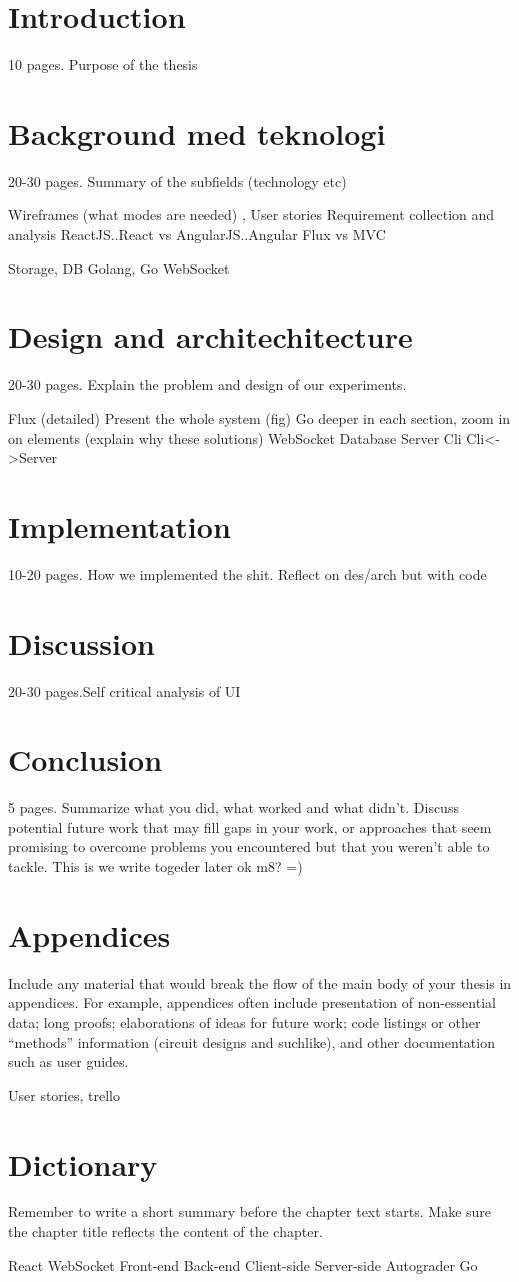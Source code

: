 \documentclass[12pt, a4paper]{report}
\begin{document}
\section{Introduction}
10 pages. Purpose of the thesis

\section{Background med teknologi}
20-30 pages. Summary of the subfields (technology etc)

Wireframes (what modes are needed) , User stories
Requirement collection and analysis
ReactJS..React vs AngularJS..Angular
Flux vs MVC

Storage, DB
Golang, Go
WebSocket

\section{Design and architechitecture}
20-30 pages. Explain the problem and design of our experiments.

Flux (detailed)
Present the whole system (fig)
 Go deeper in each section, zoom in on elements (explain why these solutions)
WebSocket
Database
Server
Cli
Cli<->Server

\section{Implementation}
10-20 pages. How we implemented the shit.
Reflect on des/arch but with code

\section{Discussion}
20-30 pages.Self critical analysis of UI

\section{Conclusion}
5 pages. Summarize what you did, what worked and what didn’t.
Discuss potential future work that may fill gaps in your work, or approaches that
seem promising to overcome problems you encountered but that you weren’t able
to tackle.
This is we write togeder later ok m8? =)

\section{Appendices}
Include any material that would break the flow of the main body
of your thesis in appendices. For example, appendices often include presentation
of non-essential data; long proofs; elaborations of ideas for future work; code
listings or other “methods” information (circuit designs and suchlike), and other
documentation such as user guides.

User stories, trello

\section{Dictionary}

Remember to write a short summary before the chapter text starts. 
Make sure the chapter title reflects the content of the chapter.

React
WebSocket
Front-end
Back-end
Client-side
Server-side
Autograder
Go
\end{document}
